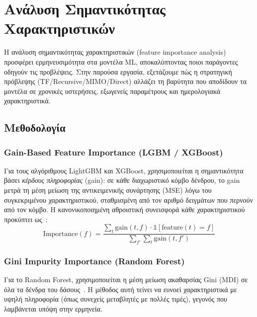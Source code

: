 \chapter{Ανάλυση Σημαντικότητας Χαρακτηριστικών}
\label{ch:fi}

Η ανάλυση σημαντικότητας χαρακτηριστικών (feature importance analysis) προσφέρει
ερμηνευσιμότητα στα μοντέλα ML, αποκαλύπτοντας ποιοι παράγοντες οδηγούν τις
προβλέψεις. Στην παρούσα εργασία, εξετάζουμε πώς η στρατηγική πρόβλεψης
(TF/Recursive/MIMO/Direct) αλλάζει τη βαρύτητα που αποδίδουν τα μοντέλα σε
χρονικές υστερήσεις, εξωγενείς παραμέτρους και ημερολογιακά χαρακτηριστικά.

\section{Μεθοδολογία}
\label{sec:fi_methodology}

\subsection*{Gain-Based Feature Importance (LGBM / XGBoost)}

Για τους αλγόριθμους LightGBM και XGBoost, χρησιμοποιείται η σημαντικότητα
βάσει \textit{κέρδους πληροφορίας} (gain): σε κάθε διαχωριστικό κόμβο δένδρου,
το gain μετρά τη μέση μείωση της αντικειμενικής συνάρτησης (MSE) λόγω του
συγκεκριμένου χαρακτηριστικού, σταθμισμένη από τον αριθμό δειγμάτων που
περνούν από τον κόμβο. Η κανονικοποιημένη αθροιστική συνεισφορά κάθε
χαρακτηριστικού προκύπτει ως~\cite{ke2017lgbm}:
\begin{equation}
    \text{Importance}(f) = \frac{\sum_{t} \text{gain}(t,f) \cdot \mathbb{1}[\text{feature}(t)=f]}
    {\sum_{f'} \sum_{t} \text{gain}(t,f')}
\end{equation}

\subsection*{Gini Impurity Importance (Random Forest)}

Για το Random Forest, χρησιμοποιείται η μέση μείωση ακαθαρσίας Gini (MDI) σε
όλα τα δένδρα του δάσους~\cite{breiman2001rf}. Η μέθοδος αυτή τείνει να
ευνοεί χαρακτηριστικά με υψηλή πληροφορία (όπως συνεχείς μεταβλητές με πολλές
τιμές), γεγονός που λαμβάνεται υπόψη στην ερμηνεία.

